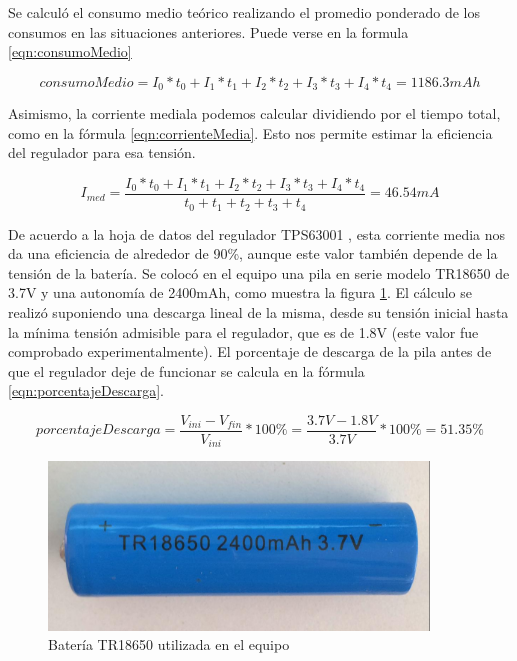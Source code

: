 Se calculó el consumo medio teórico realizando el promedio ponderado de los consumos en las situaciones anteriores. Puede verse en la formula \ref{eqn:consumoMedio}

\begin{equation} \label{eqn:consumoMedio}
consumoMedio = I_{0}*t_{0}+I_{1}*t_{1}+I_{2}*t_{2}+I_{3}*t_{3}+I_{4}*t_{4} = 1186.3 mAh
\end{equation}



Asimismo, la corriente mediala podemos calcular dividiendo por el tiempo total, como en la fórmula \ref{eqn:corrienteMedia}. Esto nos permite estimar la eficiencia del regulador para esa tensión.

\begin{equation} \label{eqn:corrienteMedia}
I_{med} = \frac{I_{0}*t_{0}+I_{1}*t_{1}+I_{2}*t_{2}+I_{3}*t_{3}+I_{4}*t_{4}}{t_{0}+t_{1}+t_{2}+t_{3}+t_{4}}= 46.54mA
\end{equation}

De acuerdo a la hoja de datos del regulador TPS63001 \citep{texas2006}, esta corriente media nos da una eficiencia de alrededor de 90\%, aunque este valor también depende de la tensión de la batería.
Se colocó en el equipo una pila en serie modelo TR18650 de 3.7V y una autonomía de 2400mAh, como muestra la figura \ref{fig:bateria}. El cálculo se realizó suponiendo una descarga lineal de la misma, desde su tensión inicial hasta la mínima tensión admisible para el regulador, que es de 1.8V\citep{texas2006} (este valor fue comprobado experimentalmente). El porcentaje de descarga de la pila antes de que el regulador deje de funcionar se calcula en la fórmula \ref{eqn:porcentajeDescarga}.

\begin{equation} \label{eqn:porcentajeDescarga}
porcentajeDescarga = \frac{V_{ini} - V_{fin}}{V_{ini}} * 100\% = \frac{3.7V- 1.8V}{3.7V} * 100\% = 51.35\%
\end{equation}

\begin{figure}[!htbp]
	\centering	
	\includegraphics[width=0.9\textwidth]{./Figures/bateria.jpeg}			
	\caption{Batería TR18650 utilizada en el equipo}
	\label{fig:bateria}
\end{figure}


